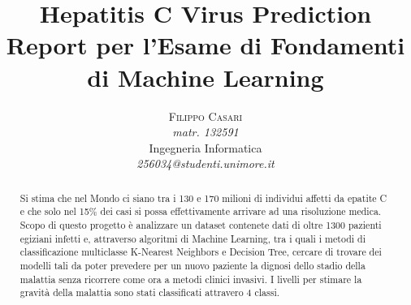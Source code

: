 \documentclass[10pt,a4paper]{article}
\begin{document}
\title{Hepatitis C Virus Prediction \\ 
\Large{Report per l'Esame di Fondamenti di Machine Learning}}
\author{\textsc{Filippo Casari}\\
    \emph{matr. 132591} \\
    Ingegneria Informatica\\
    \emph{256034@studenti.unimore.it}
    }
\date{}


\maketitle
\clearpage
\tableofcontents{}
\clearpage

\begin{abstract}

\normalsize
Si stima che nel Mondo ci siano tra i 130 e 170 milioni di individui affetti da epatite C e che solo nel 15\% dei casi si possa effettivamente arrivare ad una risoluzione medica. Scopo di questo progetto è analizzare un dataset contenete dati di oltre 1300 pazienti egiziani infetti e, attraverso algoritmi di Machine Learning, tra i quali i metodi di classificazione multiclasse K-Nearest Neighbors e Decision Tree, cercare di trovare dei modelli tali da poter prevedere per un nuovo paziente la dignosi dello stadio della malattia senza ricorrere come ora a metodi clinici invasivi. I livelli per stimare la gravità della malattia sono stati classificati attravero 4 classi. 


\end{abstract}



\clearpage







\clearpage
{}

\end{document}
